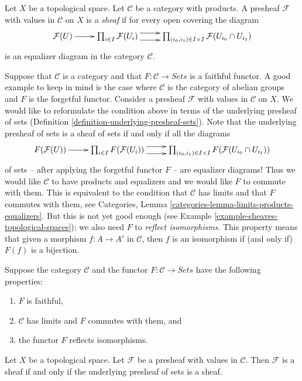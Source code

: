\begin{definition}
\label{definition-sheaf-values-in-category}
Let $X$ be a topological space. Let $\mathcal{C}$ be
a category with products. A presheaf $\mathcal{F}$ with
values in $\mathcal{C}$ on $X$ is a {\it sheaf}
if for every open covering the diagram
$$
\xymatrix{
\mathcal{F}(U) \ar[r]
&
\prod\nolimits_{i\in I}
\mathcal{F}(U_i)
\ar@<1ex>[r] \ar@<-1ex>[r]
&
\prod\nolimits_{(i_0, i_1) \in I \times I}
\mathcal{F}(U_{i_0} \cap U_{i_1})
}
$$
is an equalizer diagram in the category $\mathcal{C}$.
\end{definition}

\noindent
Suppose that $\mathcal{C}$ is a category and that
$F : \mathcal{C} \to \textit{Sets}$ is a faithful functor.
A good example to keep in mind is the case where $\mathcal{C}$
is the category of abelian groups and $F$ is the forgetful functor.
Consider a presheaf $\mathcal{F}$ with values in $\mathcal{C}$ on $X$.
We would like to reformulate the condition above in terms
of the underlying presheaf of sets
(Definition \ref{definition-underlying-presheaf-sets}).
Note that the underlying
presheaf of sets is a sheaf of sets if and only if all the
diagrams
$$
\xymatrix{
F(\mathcal{F}(U)) \ar[r]
&
\prod\nolimits_{i\in I}
F(\mathcal{F}(U_i))
\ar@<1ex>[r] \ar@<-1ex>[r]
&
\prod\nolimits_{(i_0, i_1) \in I \times I}
F(\mathcal{F}(U_{i_0} \cap U_{i_1}))
}
$$
of sets -- after applying the forgetful functor $F$ -- are
equalizer diagrams! Thus we would like $\mathcal{C}$ to have
products and equalizers and we would like $F$ to commute with
them. This is equivalent to the condition that $\mathcal{C}$
has limits and that $F$ commutes with them, see
Categories, Lemma \ref{categories-lemma-limits-products-equalizers}.
But this is not yet good enough
(see Example \ref{example-sheaves-topological-spaces});
we also need $F$ to {\it reflect isomorphisms}.
This property means that given a morphism
$f : A \to A'$ in $\mathcal{C}$, then $f$ is
an isomorphism if (and only if) $F(f)$ is a bijection.

\begin{lemma}
\label{lemma-sheaves-structure}
Suppose the category $\mathcal{C}$ and
the functor $F : \mathcal{C} \to \textit{Sets}$
have the following properties:
\begin{enumerate}
\item $F$ is faithful,
\item $\mathcal{C}$ has limits and $F$ commutes with them, and
\item the functor $F$ reflects isomorphisms.
\end{enumerate}
Let $X$ be a topological space. Let $\mathcal{F}$
be a presheaf with values in $\mathcal{C}$.
Then $\mathcal{F}$ is a sheaf if and only if the
underlying presheaf of sets is a sheaf.
\end{lemma}

